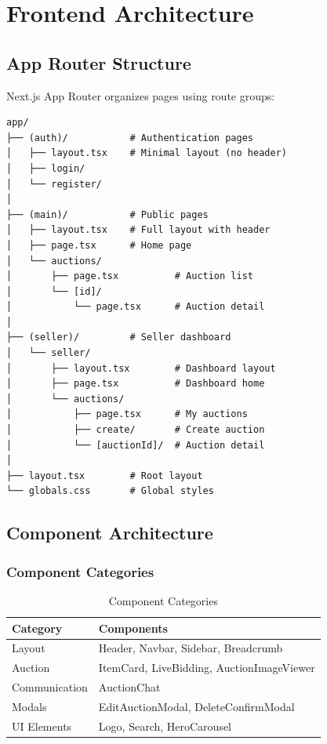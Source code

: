 \documentclass[12pt,a4paper]{report}
\begin{document}
\chapter{Frontend Architecture}

\section{App Router Structure}

Next.js App Router organizes pages using route groups:

\begin{lstlisting}[caption=Route Group Organization]
app/
├── (auth)/           # Authentication pages
│   ├── layout.tsx    # Minimal layout (no header)
│   ├── login/
│   └── register/
│
├── (main)/           # Public pages
│   ├── layout.tsx    # Full layout with header
│   ├── page.tsx      # Home page
│   └── auctions/
│       ├── page.tsx          # Auction list
│       └── [id]/
│           └── page.tsx      # Auction detail
│
├── (seller)/         # Seller dashboard
│   └── seller/
│       ├── layout.tsx        # Dashboard layout
│       ├── page.tsx          # Dashboard home
│       └── auctions/
│           ├── page.tsx      # My auctions
│           ├── create/       # Create auction
│           └── [auctionId]/  # Auction detail
│
├── layout.tsx        # Root layout
└── globals.css       # Global styles
\end{lstlisting}

\section{Component Architecture}

\subsection{Component Categories}

\begin{table}[H]
\centering
\begin{tabularx}{\textwidth}{|l|X|}
\hline
\textbf{Category} & \textbf{Components} \\
\hline
Layout & Header, Navbar, Sidebar, Breadcrumb \\
\hline
Auction & ItemCard, LiveBidding, AuctionImageViewer \\
\hline
Communication & AuctionChat \\
\hline
Modals & EditAuctionModal, DeleteConfirmModal \\
\hline
UI Elements & Logo, Search, HeroCarousel \\
\hline
\end{tabularx}
\caption{Component Categories}
\end{table}
\end{document}
